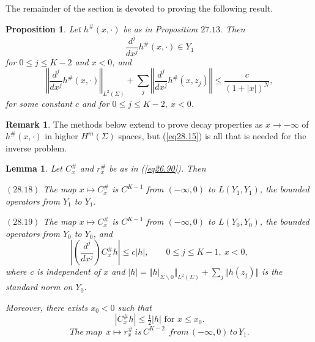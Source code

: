 \documentclass{surv-l}
\theoremstyle{plain}
\newtheorem{lem}[theorem]{Lemma}
\newtheorem{prop}[theorem]{Proposition}
\theoremstyle{definition}
\newtheorem{remark}[theorem]{Remark}
\numberwithin{equation}{chapter}
\begin{document}
The remainder of the section is devoted to proving the following result.
\setcounter{theorem}{12}
\begin{prop}\label{prop28.13} Let $h^{\#}(x, \cdot)$ be as in Proposition $27.13.$ Then
\setcounter{equation}{13}
\begin{equation}\label{eq28.14}
\frac{d^{j}}{dx^{j}}h^{\#}(x, \cdot)\in Y_{1}
\end{equation}
for $0\leq j\leq K-2$ and $x<0$, and
\begin{equation}\label{eq28.15}
\left\Vert\frac{d^{j}}{dx^{j}}h^{\#}(x, \cdot)\right\Vert_{L^{2}(\Sigma)}+\sum_{j}\left\Vert\frac{d^{j}}{d{x^{j}}}h^{\#}(x, z_{j})\right\Vert\leq\frac{c}{({1}+|x|)^{N}},
\end{equation}
for some constant $c$ and for $0\leq j\leq K-2,\ x <0$.
\end{prop}
\setcounter{theorem}{15}
\begin{remark}\label{rem28.16} The methods below extend to prove decay properties as $ x\rightarrow-\infty$ of $h^{\#}(x, \cdot)$ in higher $H^{m}(\Sigma)$ spaces, but (\ref{eq28.15}) is all that is needed for the inverse problem.
\end{remark}

\begin{lem}\label{lem28.17}
Let $C_{x}^{\#}$ and $r_{x}^{\#}$ be as in \emph{(\ref{eq26.90})}. Then

$(28.18)$ The map $ x\mapsto C_{x}^{\#}$ is $C^{K-1}$ from $(-\infty, 0)$ to $L(Y_{1}, Y_{1})$, the bounded
operators from $Y_{1}$ to $Y_{1}$.

$(28.19)$ The map $ x\mapsto C_{x}^{\#}$ is $C^{K-1}$ from $(-\infty,0)$ to $L(Y_{0}, Y_{0})$, the bounded operators from $Y_{0}$ to $Y_{0}$, and
\begin{equation*}
\left|\left(\frac{d^{j}}{dx^{j}}\right)C_{x}^{\#}h\right|\leq c|h|,\qquad 0\leq j\leq K-1,\ x<0,
\end{equation*}
where c is independent of $x$ and $|h|= \Vert h|_{\Sigma\backslash 0}\Vert_{L^{2}(\Sigma)}+\sum_{j}\Vert h(z_{j})\Vert$ is the standard norm on $Y_{0}$.

Moreover, there exists $x_{0}<0$ such that
\setcounter{equation}{19}
\begin{equation}\label{eq28.20}
|C_{x}^{\#}h|\leq\tfrac{1}{2}|h|\text{ for } x\leq x_{0}.
\end{equation}
\begin{equation}\label{eq28.21}
The\ map\ \ x\mapsto r_{x}^{\#}\, is\, C^{K-2}\ \ from\, (-\infty, 0)\, to\,Y_{1}.
\end{equation}
\end{lem}
\end{document}

